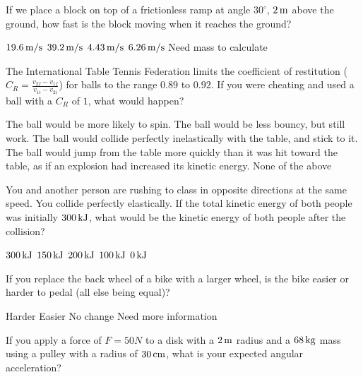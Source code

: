 \documentclass[answers]{exam}
\newcommand{\degree}{^\circ}
\begin{document}
\begin{questions}
\question If we place a block on top of a frictionless ramp at angle $30\degree$, $\unit[2]{m}$ above the ground, how fast is the block moving when it reaches the ground?


\begin{choices}
\choice $\unit[19.6]{m/s}$
\choice $\unit[39.2]{m/s}$
\choice $\unit[4.43]{m/s}$
\CorrectChoice $\unit[6.26]{m/s}$ 
\choice Need mass to calculate
\end{choices}

\question The International Table Tennis Federation limits the coefficient of restitution ($C_R = \frac{v_{2f} - v_{1f}}{v_{1i}-v_{2i}}$) for balls to the range $0.89$ to $0.92$. If you were cheating and used a ball with a $C_R$ of $1$, what would happen?
\begin{choices}
\choice The ball would be more likely to spin.
\choice The ball would be less bouncy, but still work.
\choice The ball would collide perfectly inelastically with the table, and stick to it.
\choice The ball would jump from the table more quickly than it was hit toward the table, as if an explosion had increased its kinetic energy.
\CorrectChoice None of the above 
\end{choices}

\question You and another person are rushing to class in opposite directions at the same speed. You collide perfectly elastically. If the total kinetic energy of both people was initially $\unit[300]{kJ}$, what would be the kinetic energy of both people after the collision?
\begin{choices}
\CorrectChoice $\unit[300]{kJ}$ 
\choice $\unit[150]{kJ}$
\choice $\unit[200]{kJ}$
\choice $\unit[100]{kJ}$
\choice $\unit[0]{kJ}$
\end{choices}

\question If you replace the back wheel of a bike with a larger wheel, is the bike easier or harder to pedal (all else being equal)?
\begin{choices}
\CorrectChoice Harder 
\choice Easier
\choice No change
\choice Need more information
\end{choices}

\question If you apply a force of $F = \unit{50}{N}$ to a disk with a $\unit[2]{m}$ radius and a $\unit[68]{kg}$ mass using a pulley with a radius of $\unit[30]{cm}$, what is your expected angular acceleration?


\end{questions}
\end{document}
